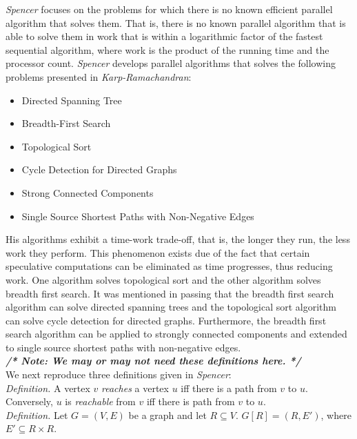 \documentclass[paper=a4, fontsize=11pt]{scrartcl} %
\numberwithin{equation}{section} %
\numberwithin{figure}{section} %
\numberwithin{table}{section} %
\begin{document}
\textit{Spencer\cite{S97}} focuses on the problems for which there is no known efficient parallel algorithm that solves them. That is, there is no known parallel algorithm that is able to solve them in work that is within a logarithmic factor of the fastest sequential algorithm, where work is the product of the running time and the processor count. \textit{Spencer\cite{S97}} develops parallel algorithms that solves the following problems presented in \textit{Karp-Ramachandran\cite{KR90}}:

\begin{itemize}
\item Directed Spanning Tree
\item Breadth-First Search
\item Topological Sort
\item Cycle Detection for Directed Graphs
\item Strong Connected Components
\item Single Source Shortest Paths with Non-Negative Edges
\end{itemize}

His algorithms exhibit a time-work trade-off, that is, the longer they run, the less work they perform. This phenomenon exists due of the fact that certain speculative computations can be eliminated as time progresses, thus reducing work. One algorithm solves topological sort and the other algorithm solves breadth first search. It was mentioned in passing that the breadth first search algorithm can solve directed spanning trees and the topological sort algorithm can solve cycle detection for directed graphs. Furthermore, the breadth first search algorithm can be applied to strongly connected components and extended to single source shortest paths with non-negative edges.\\

\textbf{\textit{/* Note: We may or may not need these definitions here. */}}\\
We next reproduce three definitions given in \textit{Spencer\cite{S97}}:\\

\textit{Definition.} A vertex $v$ \textit{reaches} a vertex $u$ iff there is a path from $v$ to $u$. Conversely, $u$ is \textit{reachable} from $v$ iff there is path from $v$ to $u$.\\

\textit{Definition.} Let $G = (V, E)$ be a graph and let $R \subseteq V$. $G[R] = (R, E')$, where $E' \subseteq R \times R$.\\
\end{document}
